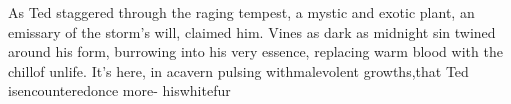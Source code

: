 As Ted staggered through the raging tempest, a mystic and exotic plant, an emissary of the storm's will, claimed him. Vines as dark as midnight sin twined around his form, burrowing into his very essence, replacing warm blood with the chill\hspace*{4cm}of unlife. It's here, in a\linebreak\hspace*{5.25cm}cavern pulsing with\linebreak\hspace*{6.15cm}malevolent growths,\linebreak\hspace*{6.75cm}that Ted is\linebreak\hspace*{7.3cm}encountered\linebreak\hspace*{7.6cm}once more\linebreak\hspace*{8.25cm}- his\linebreak\hspace*{8.3cm}white\linebreak\hspace*{8.65cm}fur
\vfill\eject
